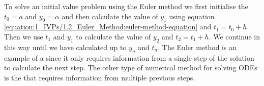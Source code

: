 \documentclass[letterpaper,10pt,english]{jupyterBook}
\begin{document}
\sphinxAtStartPar
To solve an initial value problem using the Euler method we first initialise the \(t_0 = a\) and \(y_0 = \alpha\) and then calculate the value of \(y_1\) using equation \eqref{equation:1_IVPs/1.2_Euler_Method:euler-method-equation} and \(t_1 = t_0 + h\). Then we use \(t_1\) and \(y_1\) to calculate the value of \(y_2\) and \(t_2 = t_1 + h\). We continue in this way until we have calculated up to \(y_n\) and \(t_n\). The Euler method is an example of a  since it only requires information from a single step of the solution to calculate the next step. The other type of numerical method for solving ODEs is the  that requires information from multiple previous steps.
\end{document}

